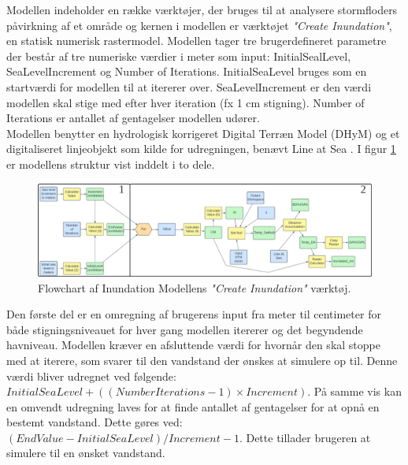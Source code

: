 Modellen indeholder en række værktøjer, der bruges til at analysere stormfloders påvirkning af et område og kernen i modellen er værktøjet \textit{"Create Inundation"}, en statisk numerisk rastermodel. Modellen tager tre brugerdefineret parametre der består af tre numeriske værdier i meter som input: InitialSealLevel, SeaLevelIncrement og Number of Iterations. InitialSeaLevel bruges som en startværdi for modellen til at itererer over. SeaLevelIncrement er den værdi modellen skal stige med efter hver iteration (fx 1 cm stigning). Number of Iterations er antallet af gentagelser modellen udører. \\
Modellen benytter en hydrologisk korrigeret Digital Terræn Model (DHyM) og et digitaliseret linjeobjekt som kilde for udregningen, benævt Line at Sea \citep{balstrom_kirby_inundation}. I figur \ref{Figur: Create Inundation} er modellens struktur vist inddelt i to dele.
\begin{figure}[H]
    \centering
    \includegraphics[width=1\linewidth]{images/teori/inundation_model_separated.jpg}
    \caption{Flowchart af Inundation Modellens \textit{"Create Inundation"} værktøj.}
    \label{Figur: Create Inundation}
\end{figure}
Den første del er en omregning af brugerens input fra meter til centimeter for både stigningsniveauet for hver gang modellen itererer og det begyndende havniveau. Modellen kræver en afsluttende værdi for hvornår den skal stoppe med at iterere, som svarer til den vandstand der ønskes at simulere op til. Denne værdi bliver udregnet ved følgende: \\$InitialSeaLevel + ((NumberIterations - 1)\times Increment)$. På samme vis kan en omvendt udregning laves for at finde antallet af gentagelser for at opnå en bestemt vandstand. Dette gøres ved: $(EndValue - InitialSeaLevel) / Increment - 1$. Dette tillader brugeren at simulere til en ønsket vandstand.\\

